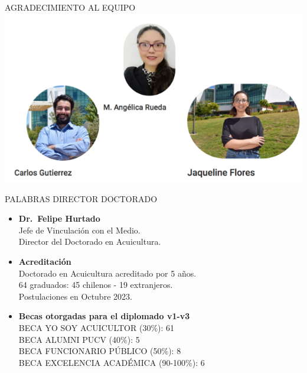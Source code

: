 \documentclass[
  ignorenonframetext,
]{beamer}
\begin{document}
\begin{frame}{AGRADECIMIENTO AL EQUIPO}
\protect\hypertarget{agradecimiento-al-equipo}{}
\includegraphics[width=0.8\linewidth]{Equipo}
\end{frame}

\begin{frame}{PALABRAS DIRECTOR DOCTORADO}
\protect\hypertarget{palabras-director-doctorado}{}
\begin{itemize}
\item
  \textbf{Dr.~Felipe Hurtado}\\
  Jefe de Vinculación con el Medio.\\
  Director del Doctorado en Acuicultura.
\item
  \textbf{Acreditación}\\
  Doctorado en Acuicultura acreditado por 5 años.\\
  64 graduados: 45 chilenos - 19 extranjeros.\\
  Postulaciones en Octubre 2023.
\item
  \textbf{Becas otorgadas para el diplomado v1-v3}\\
  BECA YO SOY ACUICULTOR (30\%): 61\\
  BECA ALUMNI PUCV (40\%): 5\\
  BECA FUNCIONARIO PÚBLICO (50\%): 8\\
  BECA EXCELENCIA ACADÉMICA (90-100\%): 6
\end{itemize}
\end{frame}
\end{document}
